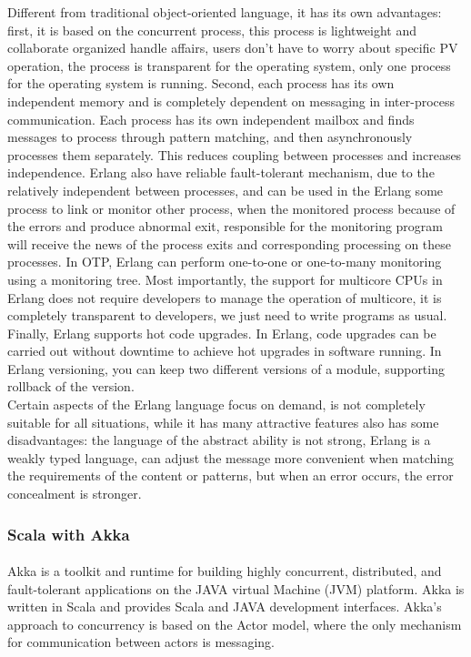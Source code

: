 \documentclass{article}
\begin{document}
Different from traditional object-oriented language, it has its own advantages: first, it is based on the concurrent process, this process is lightweight and collaborate organized handle affairs, users don't have to worry about specific PV operation, the process is transparent for the operating system, only one process for the operating system is running. Second, each process has its own independent memory and is completely dependent on messaging in inter-process communication. Each process has its own independent mailbox and finds messages to process through pattern matching, and then asynchronously processes them separately. This reduces coupling between processes and increases independence. Erlang also have reliable fault-tolerant mechanism, due to the relatively independent between processes, and can be used in the Erlang some process to link or monitor other process, when the monitored process because of the errors and produce abnormal exit, responsible for the monitoring program will receive the news of the process exits and corresponding processing on these processes. In OTP, Erlang can perform one-to-one or one-to-many monitoring using a monitoring tree. Most importantly, the support for multicore CPUs in Erlang does not require developers to manage the operation of multicore, it is completely transparent to developers, we just need to write programs as usual. Finally, Erlang supports hot code upgrades. In Erlang, code upgrades can be carried out without downtime to achieve hot upgrades in software running. In Erlang versioning, you can keep two different versions of a module, supporting rollback of the version.\\

Certain aspects of the Erlang language focus on demand, is not completely suitable for all situations, while it has many attractive features also has some disadvantages: the language of the abstract ability is not strong, Erlang is a weakly typed language, can adjust the message more convenient when matching the requirements of the content or patterns, but when an error occurs, the error concealment is stronger.\\

\subsubsection{Scala with Akka}\vspace{16pt}
\paragraph{}\vspace{11pt}\justifying
Akka is a toolkit and runtime for building highly concurrent, distributed, and fault-tolerant applications on the JAVA virtual Machine (JVM) platform. Akka is written in Scala and provides Scala and JAVA development interfaces. Akka's approach to concurrency is based on the Actor model, where the only mechanism for communication between actors is messaging.\\
\end{document}
